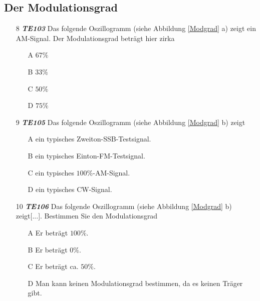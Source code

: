 \subsection*{Der Modulationsgrad}

\begin{enumerate} 
	\item[8] \emph{\textbf{TE103}}  Das folgende Oszillogramm (siehe Abbildung \ref{Modgrad} a) zeigt ein AM-Signal. Der Modulationsgrad beträgt hier zirka
	\begin{enumerate}
	\itemsep1pt\parskip0pt
		\item[A] $67\%$
		\item[B] $33\%$
		\item[C] $50\%$
		\item[D] $75\%$
	\end{enumerate} 
	\item[9] \emph{\textbf{TE105}}   Das folgende Oszillogramm (siehe Abbildung \ref{Modgrad} b) zeigt
	\begin{enumerate}
	\itemsep1pt\parskip0pt
		\item[A] ein typisches Zweiton-SSB-Testsignal.
		\item[B] ein typisches Einton-FM-Testsignal.
		\item[C] ein typisches $100\%$-AM-Signal.
		\item[D] ein typisches CW-Signal.
	\end{enumerate} 
	\item[10] \emph{\textbf{TE106}}   Das folgende Oszillogramm (siehe Abbildung \ref{Modgrad} b) zeigt[...]. Bestimmen Sie den Modulationsgrad
	\begin{enumerate}
	\itemsep1pt\parskip0pt
		\item[A] Er beträgt $100\%$.
		\item[B] Er beträgt $0\%$.
		\item[C] Er beträgt ca. $50\%$.
		\item[D] Man kann keinen Modulationsgrad bestimmen, da es keinen Träger gibt.
	\end{enumerate} 
\end{enumerate} 

